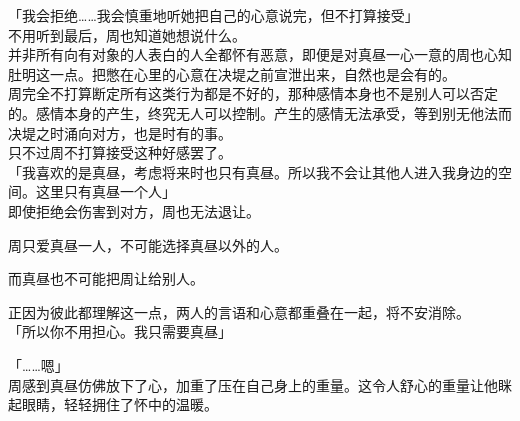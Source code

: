 「我会拒绝……我会慎重地听她把自己的心意说完，但不打算接受」\\

不用听到最后，周也知道她想说什么。\\

并非所有向有对象的人表白的人全都怀有恶意，即便是对真昼一心一意的周也心知肚明这一点。把憋在心里的心意在决堤之前宣泄出来，自然也是会有的。\\

周完全不打算断定所有这类行为都是不好的，那种感情本身也不是别人可以否定的。感情本身的产生，终究无人可以控制。产生的感情无法承受，等到别无他法而决堤之时涌向对方，也是时有的事。\\

只不过周不打算接受这种好感罢了。\\

「我喜欢的是真昼，考虑将来时也只有真昼。所以我不会让其他人进入我身边的空间。这里只有真昼一个人」\\

即使拒绝会伤害到对方，周也无法退让。

周只爱真昼一人，不可能选择真昼以外的人。

而真昼也不可能把周让给别人。

正因为彼此都理解这一点，两人的言语和心意都重叠在一起，将不安消除。\\

「所以你不用担心。我只需要真昼」

「……嗯」\\

周感到真昼仿佛放下了心，加重了压在自己身上的重量。这令人舒心的重量让他眯起眼睛，轻轻拥住了怀中的温暖。
